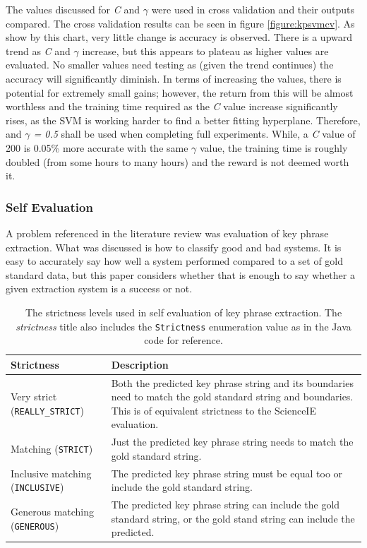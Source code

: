 The values discussed for \textit{C} and $\gamma$ were used in cross validation and their outputs compared. The cross validation results can be seen in figure \ref{figure:kpsvmcv}. As show by this chart, very little change is accuracy is observed. There is a upward trend as \textit{C} and $\gamma$ increase, but this appears to plateau as higher values are evaluated. No smaller values need testing as (given the trend continues) the accuracy will significantly diminish. In terms of increasing the values, there is potential for extremely small gains; however, the return from this will be almost worthless and the training time required as the \textit{C} value increase significantly rises, as the SVM is working harder to find a better fitting hyperplane. Therefore,  and \textit{$\gamma$ = 0.5} shall be used when completing full experiments. While, a \textit{C} value of 200 is 0.05\% more accurate with the same $\gamma$ value, the training time is roughly doubled (from some hours to many hours) and the reward is not deemed worth it.

\subsubsection*{Self Evaluation}
A problem referenced in the literature review was evaluation of key phrase extraction. What was discussed is how to classify good and bad systems. It is easy to accurately say how well a system performed compared to a set of gold standard data, but this paper considers whether that is enough to say whether a given extraction system is a success or not.

\begin{table}
	\centering
	\begin{tabular}{ C{3cm} | C{10cm} }
		\textbf{Strictness} & \textbf{Description} \\
		\hline
		Very strict (\texttt{REALLY\_STRICT}) & Both the predicted key phrase string and its boundaries need to match the gold standard string and boundaries. This is of equivalent strictness to the ScienceIE evaluation. \\
		\hline
		Matching (\texttt{STRICT}) & Just the predicted key phrase string needs to match the gold standard string. \\
		\hline
		Inclusive matching (\texttt{INCLUSIVE}) & The predicted key phrase string must be equal too or include the gold standard string. \\
		\hline
		Generous matching (\texttt{GENEROUS}) & The predicted key phrase string can include the gold standard string, or the gold stand string can include the predicted. \\
	\end{tabular}
	\caption[Strictness Descriptions for Self Evaluation of Key Phrases]{The strictness levels used in self evaluation of key phrase extraction. The \textit{strictness} title also includes the \texttt{Strictness} enumeration value as in the Java code for reference.}
	\label{table:strictness}
\end{table}

